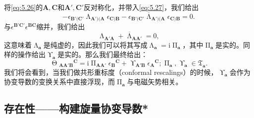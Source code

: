 将\ref{eq:5.26}的$\boldsymbol{A} ,\boldsymbol{C}$和$\boldsymbol{A} ',\boldsymbol{C} '$反对称化，并带入\ref{eq:5.27}，我们给出
\begin{equation*}
	-\epsilon _{\boldsymbol{B} '(\boldsymbol{C} '} \upLambda _{\boldsymbol{A} ')(\boldsymbol{A}} \epsilon _{\boldsymbol{C})\boldsymbol{B}} -\epsilon _{\boldsymbol{B} '(\boldsymbol{C} '}\overline{\upLambda }_{\boldsymbol{A} ')(\boldsymbol{A}} \epsilon _{\boldsymbol{C})\boldsymbol{B}} =0.
\end{equation*}
与$\epsilon ^{\boldsymbol{B} '\boldsymbol{C} '} \epsilon ^{\boldsymbol{BC}}$缩并，我们给出
\begin{equation*}
	\upLambda _{\boldsymbol{A} '\boldsymbol{A}} +\overline{\upLambda }_{\boldsymbol{AA} '} =0,
\end{equation*}
这意味着$\upLambda _{\boldsymbol{a}}$是纯虚的，因此我们可以将其写成$\upLambda _{\boldsymbol{a}} =\mathrm{i} \upPi _{\boldsymbol{a}}$，其中$\upPi _{\boldsymbol{a}}$是实的。同样的操作给出$\upUpsilon _{\boldsymbol{a}}$是实的。那么我们最终给出：
\begin{equation*}
	\upTheta {_{\boldsymbol{AA} '\boldsymbol{B}}}^{\boldsymbol{C}} =\mathrm{i} \upPi _{\boldsymbol{AA} '} \epsilon {_{\boldsymbol{B}}}^{\boldsymbol{C}} +\upUpsilon _{\boldsymbol{A} '\boldsymbol{B}} \epsilon {_{\boldsymbol{A}}}^{\boldsymbol{C}} ;\upPi _{\boldsymbol{a}} ,\upUpsilon _{\boldsymbol{a}} \in \mathfrak{T}_{\boldsymbol{a}} .
\end{equation*}
我们将会看到，当我们做共形重标度（conformal rescalings）的时候，$\upUpsilon _{\boldsymbol{a}}$会作为协变导数的变换关系中直接浮现，而$\upPi _{\boldsymbol{a}}$与电磁矢势相关。


\subsection{存在性——构建旋量协变导数*}


